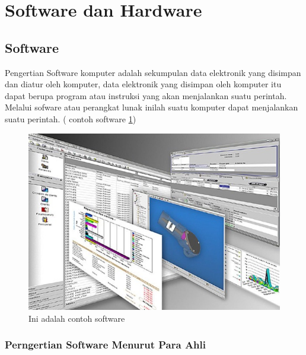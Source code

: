 \section{Software dan Hardware}
\subsection {Software}

Pengertian Software komputer adalah sekumpulan data elektronik yang disimpan dan diatur oleh komputer, data elektronik yang disimpan oleh komputer itu dapat berupa program atau instruksi yang akan menjalankan suatu perintah. Melalui sofware atau perangkat lunak inilah suatu komputer dapat menjalankan suatu perintah. ( contoh software \ref{fig:software})

\begin{figure}[!htbp]
  \centering
  \includegraphics[width=.75\textwidth]{figures/software/software.jpg}
  \caption{Ini adalah contoh software}\label{fig:software}
\end{figure}


\subsubsection{Perngertian Software Menurut Para Ahli}

